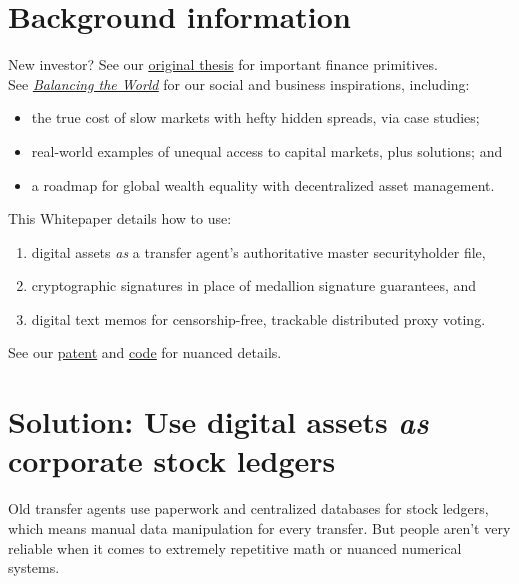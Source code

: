 \documentclass[11pt, english]{article}
\begin{document}
\begin{multicols}{2}
\section{Background information}

New investor? See our \underline{\href{http://thesis.blocktransfer.io}{original thesis}} for important finance primitives.\\

\noindent See \href{http://impact.blocktransfer.io}{\underline{\textit{Balancing the World}}} for our social and business inspirations, including:
\begin{itemize}
    \item the true cost of slow markets with hefty hidden spreads, via case studies;
    
    \item real-world examples of unequal access to capital markets, plus solutions; and
    
    \item a roadmap for global wealth equality with decentralized asset management.
\end{itemize}

\noindent This Whitepaper details how to use: \begin{enumerate}
    \item digital assets \textit{as} a transfer agent's authoritative master securityholder file,
    
    \item cryptographic signatures in place of medallion signature guarantees, and
    
    \item digital text memos for censorship-free, trackable distributed proxy voting.
\end{enumerate}
See our \underline{\href{https://patentcenter.uspto.gov/applications/17396742}{patent}} and \underline{\href{https://github.com/blocktransfer/}{code}} for nuanced details.



\section{Solution: Use digital assets \textit{as} corporate stock ledgers}

Old transfer agents use paperwork and centralized databases for stock ledgers, which means manual data manipulation for every transfer. But people aren't very reliable when it comes to extremely repetitive math or nuanced numerical systems.


\end{multicols}
\end{document}
